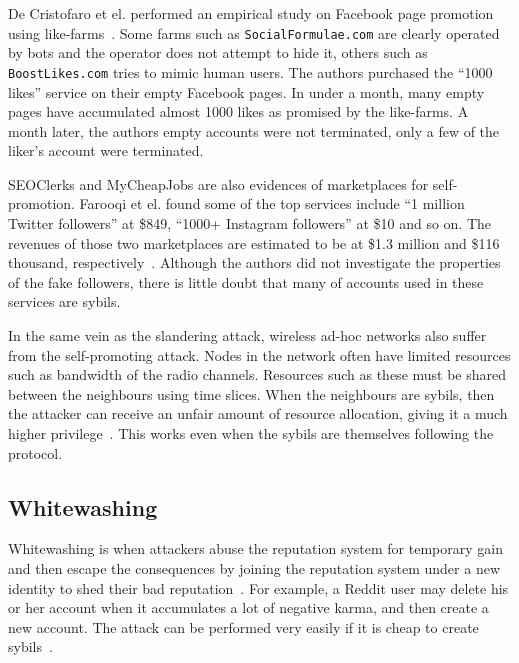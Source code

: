 
De Cristofaro et el. performed an empirical study on Facebook page promotion
using like-farms~\cite{de2014paying}. Some farms such as
\verb!SocialFormulae.com! are clearly operated by bots and the operator does not
attempt to hide it, others such as \verb!BoostLikes.com! tries to mimic human
users. The authors purchased the ``1000 likes'' service on their empty Facebook
pages. In under a month, many empty pages have accumulated almost 1000 likes as
promised by the like-farms. A month later, the authors empty accounts were not
terminated, only a few of the liker's account were terminated.


SEOClerks and MyCheapJobs are also evidences of marketplaces for self-promotion.
Farooqi et el. found some of the top services include ``1 million Twitter
followers'' at \$849, ``1000+ Instagram followers'' at \$10 and so on. The
revenues of those two marketplaces are estimated to be at \$1.3 million and
\$116 thousand, respectively~\cite{farooqi2015characterizing}. Although the
authors did not investigate the properties of the fake followers, there is
little doubt that many of accounts used in these services are sybils.

In the same vein as the slandering attack, wireless ad-hoc networks also suffer
from the self-promoting attack. Nodes in the network often have limited
resources such as bandwidth of the radio channels. Resources such as these must
be shared between the neighbours using time slices. When the neighbours are
sybils, then the attacker can receive an unfair amount of resource allocation,
giving it a much higher privilege~\cite{newsome2004sybil}. This works even when
the sybils are themselves following the protocol.

\subsection{Whitewashing}
Whitewashing is when attackers abuse the reputation system for temporary gain
and then escape the consequences by joining the reputation system under a new
identity to shed their bad reputation~\cite{marti2006taxonomy}. For example, a
Reddit user may delete his or her account when it accumulates a lot of negative
karma, and then create a new account. The attack can be performed very easily if
it is cheap to create sybils~\cite{hoffman2009survey}.

